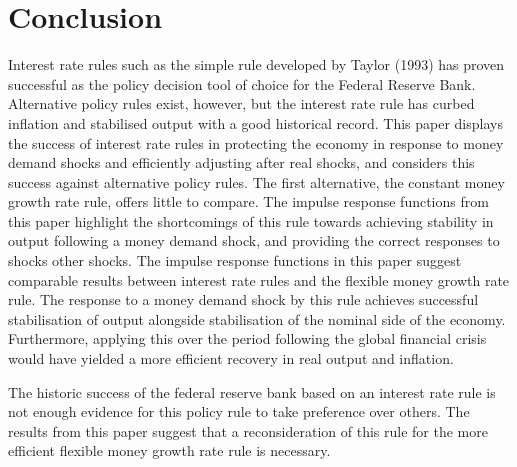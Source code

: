 \documentclass[11pt,preprint, authoryear]{elsarticle}
\numberwithin{equation}{section}
\numberwithin{figure}{section}
\numberwithin{table}{section}
\begin{document}
\newpage

\hypertarget{conclusion}{%
\section{Conclusion}\label{conclusion}}

Interest rate rules such as the simple rule developed by Taylor (1993)
has proven successful as the policy decision tool of choice for the
Federal Reserve Bank. Alternative policy rules exist, however, but the
interest rate rule has curbed inflation and stabilised output with a
good historical record. This paper displays the success of interest rate
rules in protecting the economy in response to money demand shocks and
efficiently adjusting after real shocks, and considers this success
against alternative policy rules. The first alternative, the constant
money growth rate rule, offers little to compare. The impulse response
functions from this paper highlight the shortcomings of this rule
towards achieving stability in output following a money demand shock,
and providing the correct responses to shocks other shocks. The impulse
response functions in this paper suggest comparable results between
interest rate rules and the flexible money growth rate rule. The
response to a money demand shock by this rule achieves successful
stabilisation of output alongside stabilisation of the nominal side of
the economy. Furthermore, applying this over the period following the
global financial crisis would have yielded a more efficient recovery in
real output and inflation.

The historic success of the federal reserve bank based on an interest
rate rule is not enough evidence for this policy rule to take preference
over others. The results from this paper suggest that a reconsideration
of this rule for the more efficient flexible money growth rate rule is
necessary.


\end{document}
